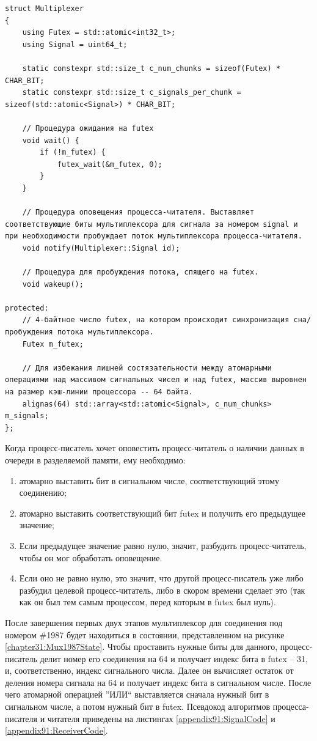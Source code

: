 \begin{lstlisting}[float=!h,caption={Структура мультиплексора в памяти},label={chapter31:MultiplexerStruct},frame=tlrb]
struct Multiplexer
{
    using Futex = std::atomic<int32_t>;
    using Signal = uint64_t;

    static constexpr std::size_t c_num_chunks = sizeof(Futex) * CHAR_BIT;
    static constexpr std::size_t c_signals_per_chunk = sizeof(std::atomic<Signal>) * CHAR_BIT;
	
	// Процедура ожидания на futex
    void wait() {
    	if (!m_futex) {
   			futex_wait(&m_futex, 0);
   		}
    }
	
	// Процедура оповещения процесса-читателя. Выставляет соответствующие биты мультиплексора для сигнала за номером signal и при необходимости пробуждает поток мультиплексора процесса-читателя.
    void notify(Multiplexer::Signal id);
    
    // Процедура для пробуждения потока, спящего на futex.
    void wakeup();

protected:
	// 4-байтное число futex, на котором происходит синхронизация сна/пробуждения потока мультиплексора.
    Futex m_futex;
	
	// Для избежания лишней состязательности между атомарными операциями над массивом сигнальных чисел и над futex, массив выровнен на размер кэш-линии процессора -- 64 байта.
    alignas(64) std::array<std::atomic<Signal>, c_num_chunks> m_signals;
};
\end{lstlisting}

Когда процесс-писатель хочет оповестить процесс-читатель о наличии данных в очереди в разделяемой памяти, ему необходимо:
\begin{enumerate}
\item атомарно выставить бит в сигнальном числе, соответствующий этому соединению;
\item атомарно выставить соответствующий бит futex и получить его предыдущее значение;
\item Если предыдущее значение равно нулю, значит, разбудить процесс-читатель, чтобы он мог обработать оповещение.
\item Если оно не равно нулю, это значит, что другой процесс-писатель уже либо разбудил целевой процесс-читатель, либо в скором времени сделает это (так как он был тем самым процессом, перед которым в futex был нуль).
\end{enumerate}

После завершения первых двух этапов мультиплексор для соединения под номером \#1987 будет находиться в состоянии, представленном на рисунке \ref{chapter31:Mux1987State}. Чтобы проставить нужные биты для данного, процесс-писатель делит номер его соединения на 64 и получает индекс бита в futex -- 31, и, соответственно, индекс сигнального числа. Далее он вычисляет остаток от деления номера сигнала на 64 и получает индекс бита в сигнальном числе. После чего атомарной операцией ''ИЛИ`` выставляется сначала нужный бит в сигнальном числе, а потом нужный бит в futex. Псевдокод алгоритмов процесса-писателя и читателя приведены на листингах \ref{appendix91:SignalCode} и \ref{appendix91:ReceiverCode}.

